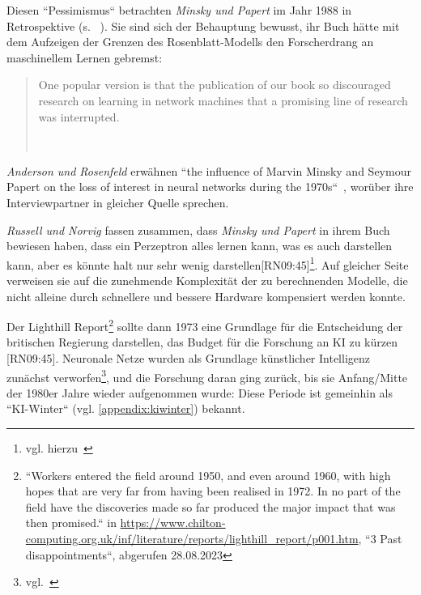 \noindent
Diesen ``Pessimismus`` betrachten \textit{Minsky und Papert} im Jahr 1988 in Retrospektive (s. ~\cite[xiii]{MP88}). Sie sind sich der Behauptung bewusst, ihr Buch hätte mit dem Aufzeigen der Grenzen des Rosenblatt-Modells den Forscherdrang an maschinellem Lernen gebremst:

\blockquote[{~\cite[xii]{MP88}}]{
One popular version is  that the publication of our book so discouraged research on learning in network machines that a promising line of research was interrupted.
}

\noindent
\textit{Anderson und Rosenfeld} erwähnen ``the influence of Marvin Minsky and Seymour Papert on the loss of interest in neural networks during the 1970s``~\cite[X]{AR98}, worüber ihre Interviewpartner in gleicher Quelle sprechen.

\textit{Russell und Norvig} fassen zusammen, dass \textit{Minsky und Papert} in ihrem Buch bewiesen haben, dass ein Perzeptron alles lernen kann, was es auch darstellen kann, aber es könnte halt nur sehr wenig darstellen[RN09:45]\footnote{
    vgl. hierzu~\cite[xiii]{MP88}
}. Auf gleicher Seite verweisen sie auf die zunehmende Komplexität der zu berechnenden Modelle, die nicht alleine durch schnellere und bessere Hardware kompensiert werden konnte.

Der Lighthill Report\footnote{
    ``Workers entered the field around 1950, and even around 1960, with high hopes that are very far from having been realised in 1972. In no part of the field have the discoveries made so far produced the major impact that was then promised.`` in \url{https://www.chilton-computing.org.uk/inf/literature/reports/lighthill\_report/p001.htm}, ``3 Past disappointments``, abgerufen 28.08.2023
} sollte dann 1973 eine Grundlage für die Entscheidung der britischen Regierung darstellen, das Budget für die Forschung an KI zu kürzen [RN09:45]. Neuronale Netze wurden als Grundlage künstlicher Intelligenz zunächst verworfen\footnote{
    vgl.~\cite[641]{Ola96}
}, und die Forschung daran ging zurück, bis sie Anfang/Mitte der 1980er Jahre wieder aufgenommen wurde: Diese Periode ist gemeinhin als ``KI-Winter`` (vgl. \ref{appendix:kiwinter}) bekannt.

